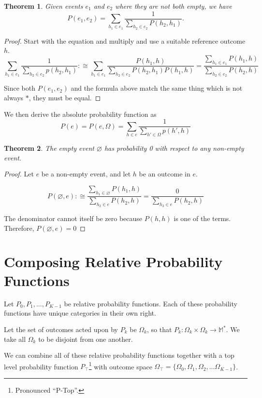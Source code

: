 \documentclass[twoside]{article}
\newcommand{\quotes}[1]{``#1''}
\theoremstyle{plain}%
\newtheorem{theorem}{Theorem}[section]
\theoremstyle{definition}
\theoremstyle{remark}
\begin{document}
\begin{theorem}
Given events \(e_1\) and \(e_2\) where they are not both empty, we have \[P(e_1, e_2) = \sum_{h_1 \in e_1} \frac{1}{\sum_{h_2 \in e_2} P(h_2, h_1)}.\]
\end{theorem}

\begin{proof}
Start with the equation and multiply and use a suitable reference outcome \(h\).
\[\sum_{h_1 \in e_1} \frac{1}{\sum_{h_2 \in e_2} p(h_2, h_1)} :\cong \sum_{h_1 \in e_1} \frac{P(h_1, h)}{\sum_{h_2 \in e_2} P(h_2, h_1) P(h_1, h)} = \frac{\sum_{h_1 \in e_1} P(h_1, h)}{\sum_{h_2 \in e_2} P(h_2, h)}\]

Since both \(P(e_1, e_2)\) and the formula above match the same thing which is not always \(\ast\), they must be equal.
\end{proof}

We then derive the absolute probability function as
\[P(e) = P(e, \Omega) = \sum_{h \in e} \frac{1}{\sum_{h' \in \Omega}p(h', h)}\]

\begin{theorem}
\label{thm:empty_event_impossible}
The empty event \(\varnothing\) has probability 0 with respect to any non-empty event.
\end{theorem}

\begin{proof}
Let \(e\) be a non-empty event, and let \(h\) be an outcome in \(e\).

\[P(\varnothing, e) :\cong \frac{\sum_{h_1 \in \varnothing} P(h_1, h)}{\sum_{h_2 \in e} P(h_2, h)} = \frac{0}{\sum_{h_2 \in e} P(h_2, h)}\]

The denominator cannot itself be zero because \(P(h, h)\) is one of the terms. Therefore, \(P(\varnothing, e) = 0\)
\end{proof}

\section{Composing Relative Probability Functions}

Let \(P_0, P_1, ..., P_{K-1}\) be relative probability functions. Each of these probability functions have unique categories in their own right.

Let the set of outcomes acted upon by \(P_k\) be \(\Omega_k\), so that \(P_k: \Omega_k \times \Omega_k \rightarrow \mathbb{M}^{\ast}\). We take all \(\Omega_k\) to be disjoint from one another.

We can combine all of these relative probability functions together with a top level probability function \(P_\top\)\footnote{Pronounced \quotes{P-Top}.} with outcome space \(\Omega_\top = \{\Omega_0, \Omega_1, \Omega_2, ... \Omega_{K- 1}\}\).
\end{document}
